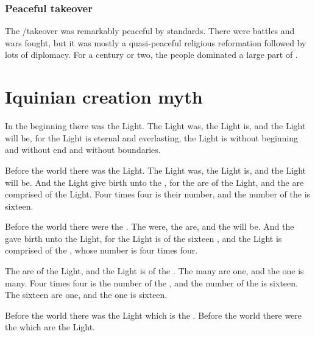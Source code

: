 \subsection{Peaceful takeover}
The \Telcra/\Tepharin takeover was remarkably peaceful by \Miithian standards. 
There were battles and wars fought, but it was mostly a quasi-peaceful religious reformation followed by lots of diplomacy. 
For a century or two, the \Tepharin people dominated a large part of \Azmith. 
































\chapter{Iquinian creation myth}
In the beginning there was the Light. The Light was, the Light is, and the Light will be, for the Light is eternal and everlasting, the Light is without beginning and without end and without boundaries. 

Before the world there was the Light. The Light was, the Light is, and the Light will be. And the Light give birth unto the \Sephiroth{}, for the \Sephiroth{} are of the Light, and the \Sephiroth{} are comprised of the Light. Four times four is their number, and the number of the \Sephiroth{} is sixteen. 

Before the world there were the \Sephiroth. The \Sephiroth{} were, the \Sephiroth{} are, and the \Sephiroth{} will be. And the \Sephiroth{} gave birth unto the Light, for the Light is of the sixteen \Sephiroth{}, and the Light is comprised of the \Sephiroth{}, whose number is four times four. 

The \Sephiroth{} are of the Light, and the Light is of the \Sephiroth{}. The many are one, and the one is many. Four times four is the number of the \Sephiroth, and the number of the \Sephiroth{} is sixteen. The sixteen are one, and the one is sixteen. 

Before the world there was the Light which is the \Sephiroth{}. Before the world there were the \Sephiroth{} which are the Light. 

